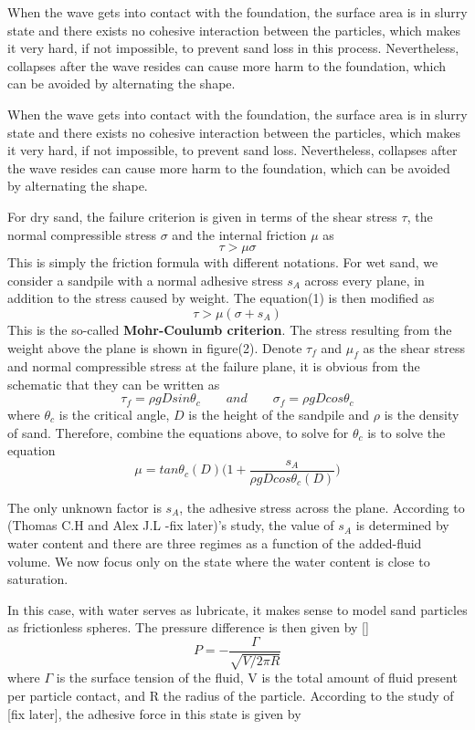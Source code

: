 \documentclass[12pt]{article}
\begin{document}
\par
When the wave gets into contact with the foundation, the surface area is in slurry state and there exists no cohesive interaction between the particles, which makes it very hard, if not impossible, to prevent sand loss in this process. Nevertheless, collapses after the wave resides can cause more harm to the foundation, which can be avoided by alternating the shape.
\par
When the wave gets into contact with the foundation, the surface area is in slurry state and there exists no cohesive interaction between the particles, which makes it very hard, if not impossible, to prevent sand loss. Nevertheless, collapses after the wave resides can cause more harm to the foundation, which can be avoided by alternating the shape.
\par
For dry sand, the failure criterion is given in terms of the shear stress $\tau$, the normal compressible stress $\sigma$ and the internal friction $\mu$ as
$$\tau > \mu\sigma$$
This is simply the friction formula with different notations. For wet sand, we consider a sandpile with a normal adhesive stress $s_A$ across every plane, in addition to the stress caused by weight. The equation(1) is then modified as
$$\tau > \mu(\sigma + s_A)$$
This is the so-called \textbf{Mohr-Coulumb criterion}. The stress resulting from the weight above the plane is shown in figure(2). Denote $\tau_f$ and $\mu_f$ as the shear stress and normal compressible stress at the failure plane, it is obvious from the schematic that they can be written as
$$\tau_f = \rho gDsin\theta_c \qquad and \qquad \sigma_f = \rho gDcos\theta_c$$
where $\theta_c$ is the critical angle, $D$ is the height of the sandpile and $\rho$ is the density of sand. Therefore, combine the equations above, to solve for $\theta_c$ is to solve the equation
$$\mu = tan\theta_c(D)\bigg(1 + \frac{s_A}{\rho gDcos\theta_c(D)}\bigg)$$
\par
The only unknown factor is $s_A$, the adhesive stress across the plane. According to (Thomas C.H and Alex J.L -fix later)'s study, the value of $s_A$ is determined by water content and there are three regimes as a function of the added-fluid volume. We now focus only on the state where the water content is close to saturation.
\par
In this case, with water serves as lubricate, it makes sense to model sand particles as frictionless spheres. The pressure difference is then given by []
$$P = -\frac{\Gamma}{\sqrt{V/2\pi R}}$$
where $\Gamma$ is the surface tension of the fluid, V is the total amount of fluid present per particle contact, and R the radius of the particle. According to the study of [fix later], the adhesive force in this state is given by
\end{document}
